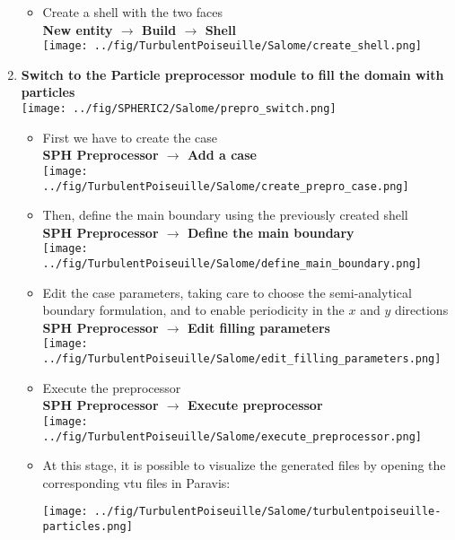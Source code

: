 \documentclass{../GPUSPHtemplate}
\begin{document}
\begin{enumerate}
\begin{itemize}
  \item Create a shell with the two faces\\
    \textbf{New entity $\to$ Build $\to$ Shell}\smallskip\\
    \texttt{[image: ../fig/TurbulentPoiseuille/Salome/create\_shell.png]}
  \end{itemize}
\item \textbf{Switch to the Particle preprocessor module to fill the domain with particles}\smallskip\\
  \texttt{[image: ../fig/SPHERIC2/Salome/prepro\_switch.png]}
  \begin{itemize}
  \item First we have to create the case\\
    \textbf{SPH Preprocessor $\to$ Add a case}\smallskip\\
    \texttt{[image: ../fig/TurbulentPoiseuille/Salome/create\_prepro\_case.png]}
  \item Then, define the main boundary using the previously created shell\\
    \textbf{SPH Preprocessor $\to$ Define the main boundary}\smallskip\\
    \texttt{[image: ../fig/TurbulentPoiseuille/Salome/define\_main\_boundary.png]}
  \item Edit the case parameters, taking care to choose the semi-analytical boundary formulation, and to
    enable periodicity in the $x$ and $y$ directions\\
    \textbf{SPH Preprocessor $\to$ Edit filling parameters}\\
    \texttt{[image: ../fig/TurbulentPoiseuille/Salome/edit\_filling\_parameters.png]}
  \item Execute the preprocessor\\
    \textbf{SPH Preprocessor $\to$ Execute preprocessor}\smallskip\\
    \texttt{[image: ../fig/TurbulentPoiseuille/Salome/execute\_preprocessor.png]}
  \item At this stage, it is possible to visualize the generated files by opening the corresponding vtu files in Paravis:\\
    \begin{center}\texttt{[image: ../fig/TurbulentPoiseuille/Salome/turbulentpoiseuille-particles.png]}\end{center}
    

\end{itemize}
\end{enumerate}
\end{document}
